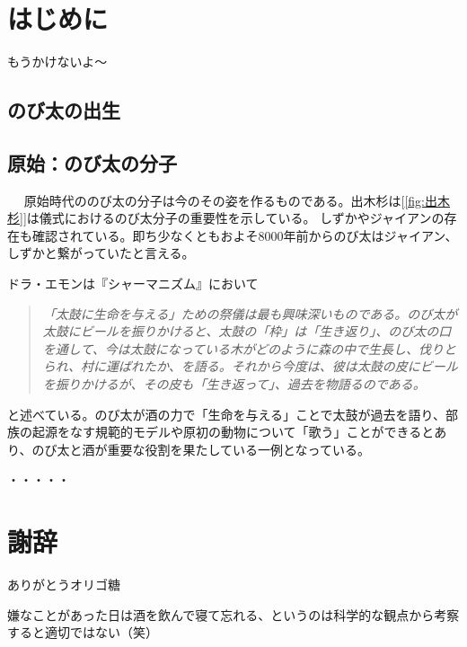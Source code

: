 \documentclass[uplatex,a4paper,10.5pt]{jsreport}
\begin{document}

\begin{tableofcontents}
  \setcounter{page}{1}
\end{tableofcontents}


\chapter{はじめに}\label{chap:はじめに}
\setcounter{page}{1}

もうかけないよ〜



\section*{のび太の出生}\label{sect:のび太の出生}
\section{原始：のび太の分子}　\label{sect:原始}
原始時代ののび太の分子は今のその姿を作るものである。出木杉は\autocite{出木杉2018}[\cref{fig:出木杉}]は儀式におけるのび太分子の重要性を示している。
しずかやジャイアンの存在も確認されている\autocite{出木杉2018}。即ち少なくともおよそ8000年前からのび太はジャイアン、しずかと繋がっていたと言える。

ドラ・エモンは『シャーマニズム』において
\begin{quote}
  \emph{「太鼓に生命を与える」ための祭儀は最も興味深いものである。のび太が太鼓にビールを振りかけると、太鼓の「枠」は「生き返り」、のび太の口を通して、今は太鼓になっている木がどのように森の中で生長し、伐りとられ、村に運ばれたか、を語る。それから今度は、彼は太鼓の皮にビールを振りかけるが、その皮も「生き返って」、過去を物語るのである。}\autocite[ママ訳]{ドラ1974}
\end{quote}
と述べている。のび太が酒の力で「生命を与える」ことで太鼓が過去を語り、部族の起源をなす規範的モデルや原初の動物について「歌う」ことができるとあり、のび太と酒が重要な役割を果たしている一例となっている。

・・・・・


\newpage
{}
{}
\chapter*{謝辞}

ありがとうオリゴ糖

\vspace{\baselineskip}
嫌なことがあった日は酒を飲んで寝て忘れる、というのは科学的な観点から考察すると適切ではない（笑）

\printbibliography[title = 参考文献]
\end{document}
